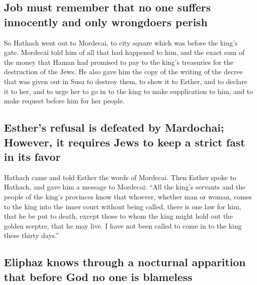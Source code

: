 \hypertarget{job-must-remember-that-no-one-suffers-innocently-and-only-wrongdoers-perish}{%
\subsection{Job must remember that no one suffers innocently and only
wrongdoers
perish}\label{job-must-remember-that-no-one-suffers-innocently-and-only-wrongdoers-perish}}

 So Hathach went out to Mordecai, to city square which was
before the king's gate.  Mordecai told him of all that had
happened to him, and the exact sum of the money that Haman had promised
to pay to the king's treasuries for the destruction of the Jews.
 He also gave him the copy of the writing of the decree
that was given out in Susa to destroy them, to show it to Esther, and to
declare it to her, and to urge her to go in to the king to make
supplication to him, and to make request before him for her people.

\hypertarget{esthers-refusal-is-defeated-by-mardochai-however-it-requires-jews-to-keep-a-strict-fast-in-its-favor}{%
\subsection{Esther's refusal is defeated by Mardochai; However, it
requires Jews to keep a strict fast in its
favor}\label{esthers-refusal-is-defeated-by-mardochai-however-it-requires-jews-to-keep-a-strict-fast-in-its-favor}}

 Hathach came and told Esther the words of Mordecai.
 Then Esther spoke to Hathach, and gave him a message to
Mordecai:  ``All the king's servants and the people of
the king's provinces know that whoever, whether man or woman, comes to
the king into the inner court without being called, there is one law for
him, that he be put to death, except those to whom the king might hold
out the golden sceptre, that he may live. I have not been called to come
in to the king these thirty days.''

\hypertarget{eliphaz-knows-through-a-nocturnal-apparition-that-before-god-no-one-is-blameless}{%
\subsection{Eliphaz knows through a nocturnal apparition that before God
no one is
blameless}\label{eliphaz-knows-through-a-nocturnal-apparition-that-before-god-no-one-is-blameless}}

